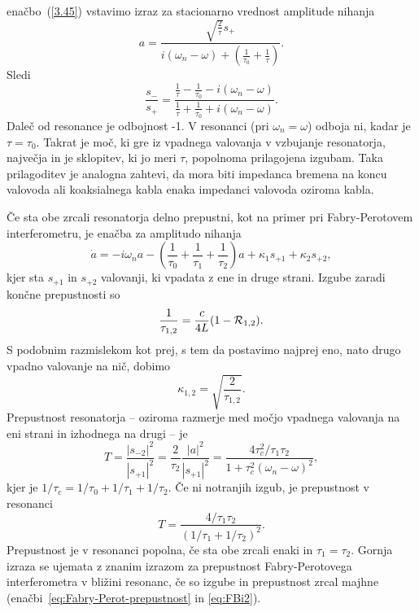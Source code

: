enačbo~(\ref{3.45}) vstavimo izraz za stacionarno vrednost amplitude
nihanja 
\begin{equation}
a=\frac{\sqrt{\frac{2}{\tau}}s_{+}}{i(\omega_{n}-\omega)+(\frac{1}{\tau_{0}}+
\frac{1}{\tau})}.
\label{3.47}
\end{equation}
Sledi
\begin{equation}
\frac{s_{-}}{s_{+}}=\frac{\frac{1}{\tau}-\frac{1}{\tau_0}-i(\omega_{n}-\omega)}
{\frac{1}{\tau}
+\frac{1}{\tau_0}+i(\omega_{n}-\omega)}.
\label{3.48}
\end{equation}
Daleč od resonance je odbojnost -1. V resonanci (pri $\omega_{n}=\omega$)
odboja ni, kadar je $\tau=\tau_{0}$. Takrat je moč, ki gre iz
vpadnega valovanja v vzbujanje resonatorja, največja in je sklopitev,
ki jo meri $\tau$, popolnoma prilagojena izgubam. Taka prilagoditev
je analogna zahtevi, da mora biti impedanca bremena na koncu valovoda
ali koaksialnega kabla enaka impedanci valovoda oziroma kabla.

Če sta obe zrcali resonatorja delno prepustni, kot na primer pri 
Fabry-Perotovem interferometru, je enačba za amplitudo nihanja 
\begin{equation}
\dot{a}=-i\omega_{n}a-\left(\frac{1}{\tau_{0}}+\frac{1}{\tau_{1}}+\frac{1}{\tau_{2}}\right)
a+\kappa_{1}s_{+1}+\kappa_{2}s_{+2},
\label{3.49}
\end{equation}
 kjer sta $s_{+1}$ in $s_{+2}$ valovanji, ki vpadata z ene in druge strani.
Izgube zaradi končne prepustnosti so
\begin{equation}
\frac{1}{\tau_{1,2}}=\frac{c}{4L}(1-{\cal R}_{1,2}).\label{3.50}
\end{equation}
S podobnim razmislekom kot prej, s tem da postavimo najprej eno, nato drugo
vpadno valovanje na nič, dobimo 
\begin{equation}
\kappa_{1,2}=\sqrt{\frac{2}{\tau_{1,2}}}.
\label{3.51}
\end{equation}
Prepustnost resonatorja -- oziroma razmerje med močjo vpadnega valovanja
na eni strani in izhodnega na drugi -- je
\begin{equation}
T=\frac{|s_{-2}|^{2}}{|s_{+1}|^{2}}=\frac{2}{\tau_{2}}\frac{|a|^{2}}{|s_{+1}|^{2}}=\frac{4\tau_c^{2}/
\tau_{1}\tau_{2}}{1+\tau_c^{2}(\omega_{n}-\omega)^{2}},
\label{3.52}
\end{equation}
 kjer je $1/\tau_c=1/\tau_{0}+1/\tau_{1}+1/\tau_{2}$. 
 Če ni notranjih izgub, je prepustnost v resonanci 
\begin{equation}
T=\frac{4/\tau_{1}\tau_{2}}{(1/\tau_{1}+1/\tau_{2})^{2}}.
\label{3.53}
\end{equation}
Prepustnost je v resonanci popolna, če sta obe zrcali enaki in $\tau_{1}=\tau_{2}$.
Gornja izraza se ujemata z znanim izrazom 
za prepustnost Fabry-Perotovega interferometra v bližini resonanc,
če so izgube in prepustnost zrcal majhne (enačbi~\ref{eq:Fabry-Perot-prepustnost} 
in \ref{eq:FBi2}). 

